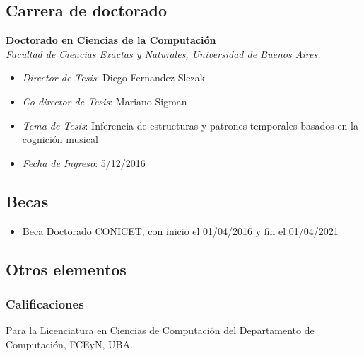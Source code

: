 \documentclass[a4paper,10pt]{article}
\begin{document}
\subsection{Carrera de doctorado}

\textbf{Doctorado en Ciencias de la Computación}\\
\indent{}\emph{Facultad de Ciencias Exactas y Naturales, Universidad de Buenos Aires.}
\begin{itemize}
    \item \emph{Director de Tesis}: Diego Fernandez Slezak
    \item \emph{Co-director de Tesis}: Mariano Sigman
    \item \emph{Tema de Tesis}: Inferencia de estructuras y patrones temporales
        basados en la cognición musical
    \item \emph{Fecha de Ingreso}: 5/12/2016
\end{itemize}

\subsection{Becas}

\begin{itemize}
    \item Beca Doctorado CONICET, con inicio el 01/04/2016 y fin el 01/04/2021
\end{itemize}

\subsection{Otros elementos}

\subsubsection{Calificaciones}

Para la Licenciatura en Ciencias de Computación del Departamento de
Computación, FCEyN, UBA.
\end{document}
